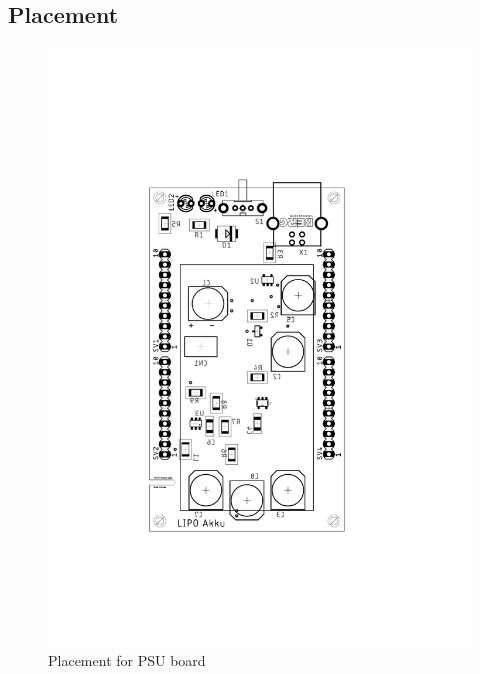 \documentclass{article}
\begin{document}
     \subsection{Placement}
         \begin{figure}[H]
  	\centering
  	\includegraphics[width=1\linewidth]{battery-placement.pdf}
  	\caption{Placement for PSU board}
 	 \label{fig:place2}
\end{figure}
\end{document}
